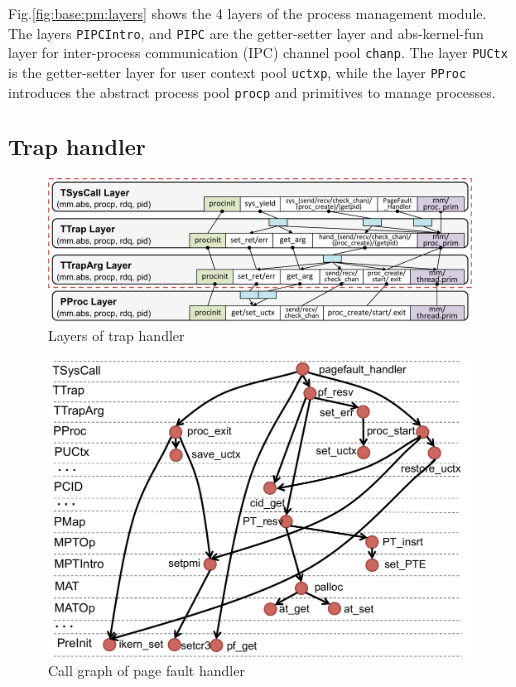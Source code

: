 Fig.\ref{fig:base:pm:layers} shows the 4 layers of the process
management module.  The layers \verb"PIPCIntro", and
\verb"PIPC" are the getter-setter layer and abs-kernel-fun layer for
inter-process communication (IPC) channel pool \verb"chanp".  The
layer \verb"PUCtx" is the getter-setter layer for user context pool
\verb"uctxp", while the layer \verb"PProc" introduces
the abstract process pool \verb"procp" and primitives to manage
processes.


\subsection{Trap handler}
\label{sec:base:trap}

\begin{figure}[ht]
\begin{center}
\includegraphics[scale=0.3]{figs/trap_layer_base}	
\caption{Layers of trap handler}
\label{fig:base:trap:layers}
\end{center}
\vspace*{-14pt}
\end{figure}

{
\setlength{\belowcaptionskip}{-10pt}
\begin{figure}
\begin{center}
\includegraphics[scale=0.3]{figs/pagefault}	
\caption{Call graph of page fault handler}
\label{fig:base:trap:pagefault}
\end{center}
\vspace*{-14pt}
\end{figure}
}

